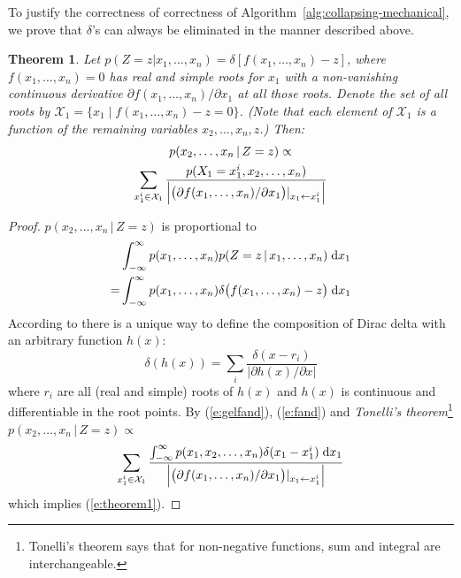 \documentclass[]{article}
\newtheorem{theorem}{Theorem}
\newcommand{\pr}{p}
\newcommand{\dd}{\;\mathrm{d}} %
\begin{document}
To justify the correctness of correctness of Algorithm~\ref{alg:collapsing-mechanical},
we prove that $\delta$'s can always be eliminated in the manner described above.
\begin{theorem} 
\label{theorem1}
Let {\footnotesize $\pr(Z\!=\!z | x_1, \ldots, x_n) = \delta[f(x_1, \ldots, x_n)-z]$}, 
where $f(x_1, \ldots, x_n) = 0$ has real and simple roots for $x_1$ with a non-vanishing continuous derivative
$\partial f(x_1, \ldots, x_n) / \partial x_1$ at all those roots.
Denote the set of all roots by 
 $ \mathcal{X}_1 = \{ x_1 \; | \; f(x_1, \ldots, x_n) - z = 0 \} $. 
(Note that each element of $ \mathcal{X}_1 $
 is a function of the remaining variables $ x_2,\dots,x_n,z $.)
 Then:
\begin{multline}\footnotesize
\label{e:theorem1}
p(x_2, \ldots, x_n \,|\, Z=z) \propto \\
\sum_{x_1^i \in \mathcal{X}_1} 
\frac{p(X_1=x_1^i, x_2, \ldots, x_n)}
{\Big|\big(\partial f(x_1, \ldots, x_n) / \partial x_1 \big)|_{x_1 \leftarrow x_1^i} \Big|}
\end{multline}
\end{theorem}
\begin{proof}
$p(x_2, \ldots, x_n \,|\, Z=z)$ is proportional to
\begin{align}
%
%
%
&\int_{-\infty}^{\infty}p(x_1, \ldots, x_n)p(Z=z \,|\, x_1, \ldots, x_n) \dd x_1 \notag\\
%
=&\int_{-\infty}^{\infty}p(x_1, \ldots, x_n)
\delta \big( f(x_1, \ldots, x_n) - z \big) \dd x_1 
\label{e:fand}
\end{align}
According to \citep{gel1964generalized}
there is a unique way to define the composition of Dirac delta with 
an arbitrary function $h(x)$:
\begin{equation}
\label{e:gelfand}
\delta(h(x)) = \sum_{i} \frac{\delta(x - r_i)}{|\partial h(x)/\partial x|}
\end{equation}
where $r_i$ are all (real and simple) roots of $h(x)$ and $h(x)$ is continuous and differentiable in the root points. By (\ref{e:gelfand}), (\ref{e:fand}) and 
\emph{Tonelli's theorem}\footnote{Tonelli's theorem says that for non-negative functions, sum and integral are interchangeable.} 
$\pr(x_2, \ldots, x_n \,|\, Z = z) \propto$
\begin{equation*}\footnotesize
\sum_{x_1^i \in \mathcal{X}_1} 
\frac{\int_{-\infty}^{\infty} p(x_1, x_2, \ldots, x_n)  \delta(x_1 - x_1^i) \dd x_1}
{\Big|\big(\partial f(x_1, \ldots, x_n) / \partial x_1 \big)|_{x_1 \leftarrow x_1^i} \Big|}
\end{equation*}
which implies (\ref{e:theorem1}).
\end{proof}
%
\end{document}
